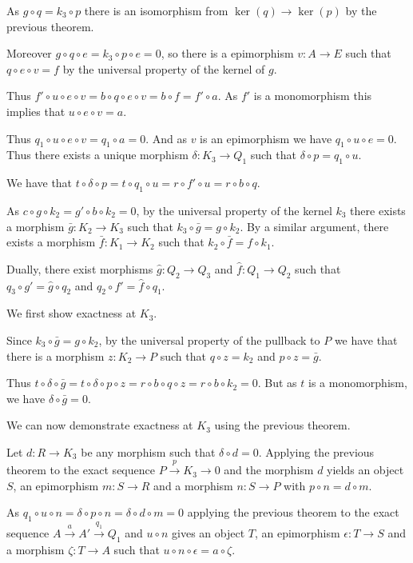 \documentclass[12pt]{article}
\begin{document}
As $g\circ q = k_3\circ p$ there is an isomorphism from $\ker(q) \to \ker(p)$ by the previous theorem. 

Moreover $g\circ q\circ e = k_3\circ p\circ e = 0$, so there is a epimorphism $v : A \to E$ such that $q\circ e\circ v = f$ by the universal property of the kernel of $g$.

Thus $f'\circ u\circ e\circ v = b\circ q\circ e\circ v = b\circ f = f'\circ a$. As $f'$ is a monomorphism this implies that $u\circ e\circ v = a$.

Thus $q_1\circ u\circ e\circ v = q_1\circ a = 0$. And as $v$ is an epimorphism we have $q_1 \circ u\circ e = 0$. Thus there exists a unique morphism $\delta : K_3 \to Q_1$ such that $\delta\circ p = q_1\circ u$.

We have that $t\circ \delta\circ p = t\circ q_1\circ u = r\circ f'\circ u = r\circ b\circ q$.

As $c\circ g\circ k_2 = g'\circ b\circ k_2 = 0$, by the universal property of the kernel $k_3$ there exists a morphism $\bar{g} : K_2 \to K_3$ such that $k_3\circ \bar{g} = g\circ k_2$. By a similar argument, there exists a morphism $\bar{f} : K_1 \to K_2$ such that $k_2\circ \bar{f} = f\circ k_1$.

Dually, there exist morphisms $\hat{g} : Q_2 \to Q_3$ and $\hat{f}: Q_1 \to Q_2$ such that $q_3\circ g' = \hat{g}\circ q_2$ and $q_2\circ f' = \hat{f}\circ q_1$.

We first show exactness at $K_3$.

Since $k_3\circ \bar{g} = g\circ k_2$, by the universal property of the pullback to $P$ we have that there is a morphism $z : K_2 \to P$ such that $q\circ z = k_2$ and $p\circ z = \bar{g}$.

Thus $t\circ \delta\circ \bar{g} = t\circ \delta\circ p\circ z = r\circ b\circ q\circ z = r\circ b\circ k_2 = 0$. But as $t$ is a monomorphism, we have $\delta\circ \bar{g} = 0$.

We can now demonstrate exactness at $K_3$ using the previous theorem.

Let $d : R \to K_3$ be any morphism such that $\delta\circ d = 0$. Applying the previous theorem to the exact sequence $P \overset{p}{\rightarrow} K_3 \rightarrow 0$ and the morphism $d$ yields an object $S$, an epimorphism $m : S \to R$ and a morphism $n : S \to P$ with $p\circ n = d\circ m$.

As $q_1\circ u\circ n = \delta\circ p\circ n = \delta\circ d\circ m = 0$ applying the previous theorem to the exact sequence $A \overset{a}{\rightarrow} A' \overset{q_1}{\rightarrow} Q_1$ and $u\circ n$ gives an object $T$, an epimorphism $\epsilon : T \to S$ and a morphism $\zeta : T \to A$ such that $u\circ n\circ \epsilon = a\circ \zeta$.
\end{document}
